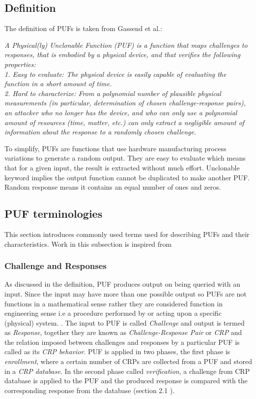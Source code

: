 \subsection{Definition}
The definition of PUFs is taken from Gassend et al.\cite{21}:

\emph{A Physical(ly) Unclonable Function (PUF) is a function that maps challenges to responses, that is embodied by a physical device, and that verifies the following properties:\\
1. Easy to evaluate: The physical device is easily capable of evaluating the function in a short amount of time.\\
2. Hard to characterize: From a polynomial number of plausible physical measurements (in particular, determination of chosen challenge-response pairs), an attacker who no longer has the device, and who can only use a polynomial amount of resources (time, matter, etc.) can only extract a negligible amount of information about the response to a randomly chosen challenge.\\}

To simplify, PUFs are functions that use hardware manufacturing process variations to generate a random output. They are easy to evaluate which means that for a given input, the result is extracted without much effort. Unclonable keyword implies the output function cannot be duplicated to make another PUF. Random response means it contains an equal number of ones and zeros.

\subsection{PUF terminologies}
This section introduces commonly used terms used for describing PUFs and their characteristics. Work in this subsection is inspired from \cite{thbook}

\subsubsection{Challenge and Responses}
As discussed in the definition, PUF produces output on being queried with an input. Since the input may have more than one possible output so PUFs are not functions in a mathematical sense rather they are considered function in engineering sense i.e a procedure performed by or acting upon a specific (physical) system. \cite{thbook}. The input to PUF is called \emph{Challenge} and output is termed as \emph{Response}, together they are known as \emph{Challenge-Response Pair} or \emph{CRP} and
the relation imposed between challenges and responses by a particular PUF is called as its \emph{CRP behavior}. PUF is applied in two phases, the first phase is \emph{enrollment}, where a certain number of CRPs are collected from a PUF and stored in a \emph{CRP database}. In the second phase called \emph{verification}, a challenge from CRP database is applied to the PUF and the produced response is compared with the corresponding response from the database (section 2.1 \cite{thbook}).

